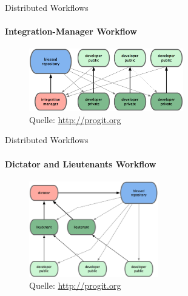 \begin{frame}{Distributed Workflows}
  \framesubtitle{Integration-Manager Workflow}
  \begin{figure}
    \includegraphics[width=0.6\textwidth]{img/wf-integration-manager}
    \caption[format=empty]{Quelle: \url{http://progit.org}}
  \end{figure}
\end{frame}

\begin{frame}{Distributed Workflows}
  \framesubtitle{Dictator and Lieutenants Workflow}
  \begin{figure}
   \includegraphics[width=0.5\textwidth]{img/wf-dictator}
    \caption[format=empty]{Quelle: \url{http://progit.org}}
  \end{figure}
\end{frame}

